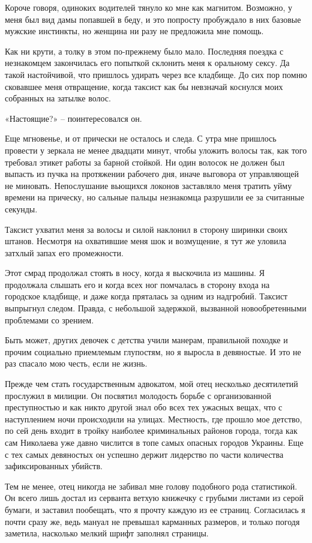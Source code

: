 \documentclass[
]{book}
\begin{document}
Короче говоря, одиноких водителей тянуло ко мне как магнитом. Возможно, у меня был вид дамы попавшей в беду, и это попросту пробуждало в них базовые мужские инстинкты, но женщина ни разу не предложила мне помощь.

Как ни крути, а толку в этом по-прежнему было мало. Последняя поездка с незнакомцем закончилась его попыткой склонить меня к оральному сексу. Да такой настойчивой, что пришлось удирать через все кладбище. До сих пор помню сковавшее меня отвращение, когда таксист как бы невзначай коснулся моих собранных на затылке волос.

«Настоящие?» -- поинтересовался он.

Еще мгновенье, и от прически не осталось и следа. С утра мне пришлось провести у зеркала не менее двадцати минут, чтобы уложить волосы так, как того требовал этикет работы за барной стойкой. Ни один волосок не должен был выпасть из пучка на протяжении рабочего дня, иначе выговора от управляющей не миновать. Непослушание вьющихся локонов заставляло меня тратить уйму времени на прическу, но сальные пальцы незнакомца разрушили ее за считанные секунды.

Таксист ухватил меня за волосы и силой наклонил в сторону ширинки своих штанов. Несмотря на охватившие меня шок и возмущение, я тут же уловила затхлый запах его промежности.

Этот смрад продолжал стоять в носу, когда я выскочила из машины. Я продолжала слышать его и когда всех ног помчалась в сторону входа на городское кладбище, и даже когда пряталась за одним из надгробий. Таксист выпрыгнул следом. Правда, с небольшой задержкой, вызванной новообретенными проблемами со зрением.

Быть может, других девочек с детства учили манерам, правильной походке и прочим социально приемлемым глупостям, но я выросла в девяностые. И это не раз спасало мою честь, если не жизнь.

Прежде чем стать государственным адвокатом, мой отец несколько десятилетий прослужил в милиции. Он посвятил молодость борьбе с организованной преступностью и как никто другой знал обо всех тех ужасных вещах, что с наступлением ночи происходили на улицах. Местность, где прошло мое детство, по сей день входит в тройку наиболее криминальных районов города, тогда как сам Николаева уже давно числится в топе самых опасных городов Украины. Еще с тех самых девяностых он успешно держит лидерство по части количества зафиксированных убийств.

Тем не менее, отец никогда не забивал мне голову подобного рода статистикой. Он всего лишь достал из серванта ветхую книжечку с грубыми листами из серой бумаги, и заставил пообещать, что я прочту каждую из ее страниц. Согласилась я почти сразу же, ведь мануал не превышал карманных размеров, и только погодя заметила, насколько мелкий шрифт заполнял страницы.
\end{document}

